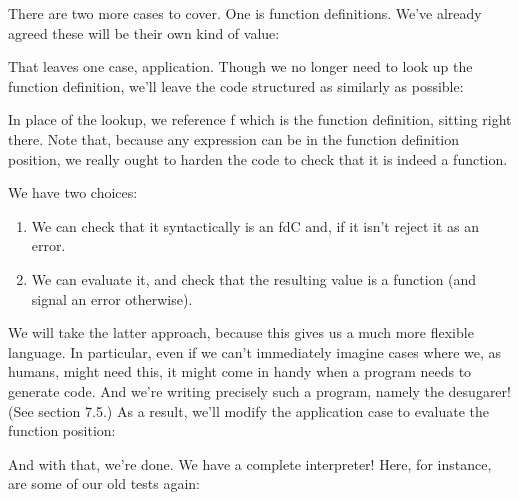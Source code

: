 There are two more cases to cover. One is function definitions. We’ve already
agreed these will be their own kind of value:

That leaves one case, application. Though we no longer need to look up the
function definition, we’ll leave the code structured as similarly as possible:

In place of the lookup, we reference f which is the function definition, sitting
right there. Note that, because any expression can be in the function definition
position, we really ought to harden the code to check that it is indeed a
function.


We have two choices:
\begin{enumerate}[nosep]
  \item 
We can check that it syntactically is an fdC and, if it isn’t reject it as an
error.
  \item 
We can evaluate it, and check that the resulting value is a function (and signal
an error otherwise).
\end{enumerate}
We will take the latter approach, because this gives us a much more flexible
language. In particular, even if we can’t immediately imagine cases where we, as
humans, might need this, it might come in handy when a program needs to generate
code. And we’re writing precisely such a program, namely the desugarer! (See
section 7.5.) As a result, we’ll modify the application case to evaluate the
function position:


And with that, we’re done. We have a complete interpreter! Here, for instance,
are some of our old tests again:
